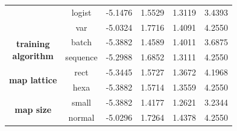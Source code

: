 \documentclass[a4paper]{IEEEtran}
\begin{document}
\begin{table}[!h]
\begin{tabular}{|c|c||r|r|r|r|}
			& logist & -5.1476 & 1.5529 & 1.3119 & 3.4393\\ \cline{2-6}
			& var & -5.0324 & 1.7716 & 1.4091 & 4.2550\\
		\hline
			\multirow{2}{*}{\parbox[c]{20mm}{\centering\textbf{training}\\ \textbf{algorithm}}}
			& batch & -5.3882 & 1.4589 & 1.4011 & 3.6875\\ \cline{2-6}
			& sequence & -5.2988 & 1.6852 & 1.3111 & 4.2550\\
		\hline
			\multirow{2}{*}{\textbf{map lattice}}
			& rect & -5.3445 & 1.5727 & 1.3672 & 4.1968\\ \cline{2-6}
			& hexa & -5.3882 & 1.5714 & 1.3559 & 4.2550\\
		\hline
			\multirow{2}{*}{\textbf{map size}}
			& small & -5.3882 & 1.4177 & 1.2621 & 3.2344\\ \cline{2-6}
			& normal & -5.0296 & 1.7264 & 1.4378 & 4.2550\\
		\hline
	\end{tabular}
	\label{tbl:somagrresults}
\end{table}
\end{document}
